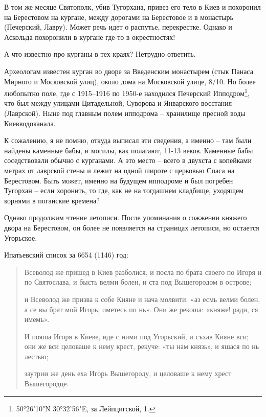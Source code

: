 В том же месяце Святополк, убив Тугорхана, привез его тело в Киев и похоронил на Берестовом на кургане, между дорогами на Берестовое и в монастырь (Печерский, Лавру). Может речь идет о распутье, перекрестке. Однако и Аскольда похоронили в кургане где-то в окрестностях!

А что известно про курганы в тех краях? Нетрудно ответить.

Археологам известен курган во дворе за Введенским монастырем (стык Панаса Мирного и Московской улиц), около дома на Московской улице, 8/10. Но более любопытно поле, где с 1915–1916 по 1950-е находился Печерский Ипподром\footnote{50°26'10"N 30°32'56"E, за Лейпцигской, 1.}, что был между улицами Цитадельной, Суворова и Январского восстания (Лаврской). Ныне под главным полем ипподрома – хранилище пресной воды Киевводоканала.

К сожалению, я не помню, откуда выписал эти сведения, а именно – там были найдены каменные бабы, и могилы, как полагают, 11-13 веков. Каменные бабы соседствовали обычно с курганами. А это место – всего в двухста с копейками метрах от лаврской стены и лежит на одной широте с церковью Спаса на Берестовом. Быть может, именно на будущем ипподроме и был погребен Тугорхан – если хоронить, то где, как не на тогдашнем кладбище, уходящем корнями в поганские времена?

Однако продолжим чтение летописи. После упоминания о сожжении княжего двора на Берестовом, он более не появляется на страницах летописи, но остается Угорьское.

Ипатьевский список за 6654 (1146) год:

\begin{quotation}
Всеволод же пришед в Киев разболися, и посла по брата своего по Игоря и по Святослава, и бысть велми болен, и ста под Вышегородом в острове;

и Всеволод же призва к собе Кияне и нача молвити: «аз есмь велми болен, а се вы брат мой Игорь, иметесь по нь». Они же рекоша: «княже! ради, ся имемь».

И пояша Игоря в Киеве, иде с ними под Угорьский, и съхав Кияне вси; они же вси целоваше к нему крест, рекуче: «ты нам князь», и яшася по нь лестью;

заутрии же день еха Игорь Вышегороду, и целоваше к нему хрест Вышегородце.



\end{quotation}

